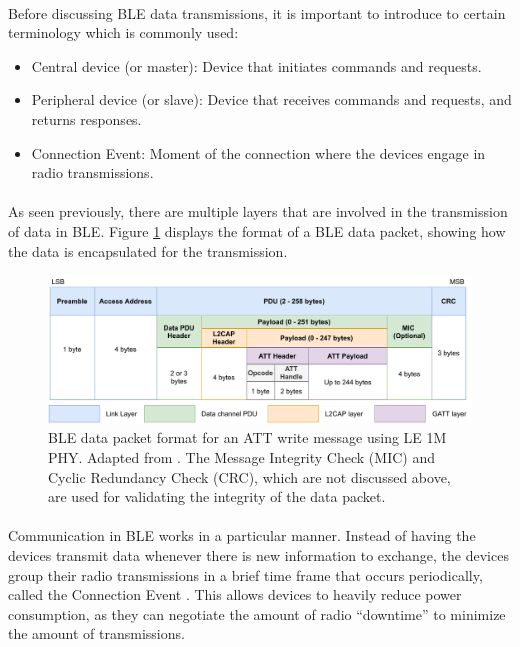 \paragraph{} Before discussing \acs{BLE} data transmissions, it is important to introduce to certain terminology which is commonly used:

\begin{itemize}
    \item Central device (or master): Device that initiates commands and requests.
    \item Peripheral device (or slave): Device that receives commands and requests, and returns responses.
    \item Connection Event: Moment of the connection where the devices engage in radio transmissions.
\end{itemize}

\paragraph{} As seen previously, there are multiple layers that are involved in the transmission of data in \acs{BLE}. Figure \ref{fig:ble-ll-packet-format} displays the format of a \acs{BLE} data packet, showing how the data is encapsulated for the transmission.

\begin{figure}[H]
    \centering
    \includegraphics[width=\linewidth]{images/bluetooth data packet format.pdf}
    \caption[Diagram of the \acs{BLE} data packet format for LE 1M \acs{PHY}.]{\acs{BLE} data packet format for an \acs{ATT} write message using LE 1M \acs{PHY}. Adapted from \cite{Specification1999, Farej2020}. The Message Integrity Check (MIC) and Cyclic Redundancy Check (CRC), which are not discussed above, are used for validating the integrity of the data packet.}
    \label{fig:ble-ll-packet-format}
\end{figure}

\paragraph{} Communication in \acs{BLE} works in a particular manner. Instead of having the devices transmit data whenever there is new information to exchange, the devices group their radio transmissions in a brief time frame that occurs periodically, called the Connection Event \cite{Specification1999}. This allows devices to heavily reduce power consumption, as they can negotiate the amount of radio ``downtime'' to minimize the amount of transmissions.

